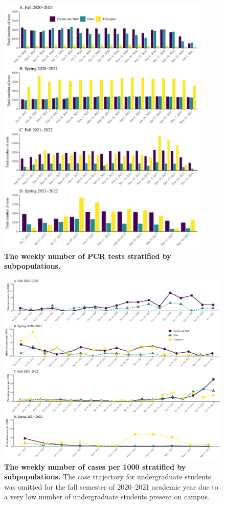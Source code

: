 \documentclass[12pt]{article}
\begin{document}
\begin{figure}[!htp]
\includegraphics[width=0.9\textwidth]{../figure_princeton_new/figure_princeton_testing.pdf}
\caption{
\textbf{The weekly number of PCR tests stratified by subpopulations.}
}
\end{figure}

\pagebreak

\begin{figure}[!htp]
\includegraphics[width=\textwidth]{../figure_princeton_new/figure_princeton_new_per_1000_bypop.pdf}
\caption{
\textbf{The weekly number of cases per 1000 stratified by subpopulations.}
The case trajectory for undergraduate students was omitted for the fall semester of 2020--2021 academic year due to a very low number of undergraduate students present on campus.
}
\end{figure}
\end{document}
